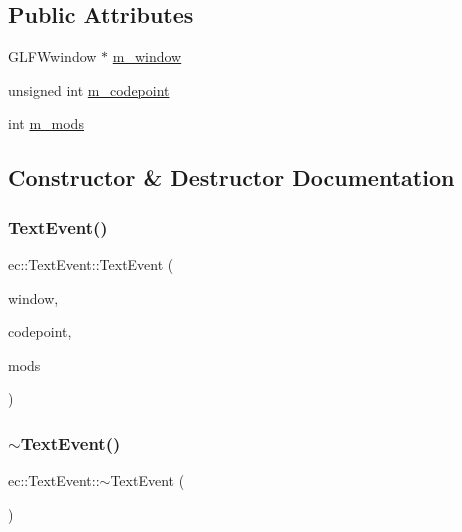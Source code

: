 \subsection*{Public Attributes}
\begin{DoxyCompactItemize}
\item 
G\+L\+F\+Wwindow $\ast$ \mbox{\hyperlink{structec_1_1_text_event_a7ab9619fd97483a705ef8e4ea6bd7f83}{m\+\_\+window}}
\item 
unsigned int \mbox{\hyperlink{structec_1_1_text_event_a2db69911cec1c314623da0682b25ab50}{m\+\_\+codepoint}}
\item 
int \mbox{\hyperlink{structec_1_1_text_event_ac869da2d72b42d8dee86c3261b00fde8}{m\+\_\+mods}}
\end{DoxyCompactItemize}


\subsection{Constructor \& Destructor Documentation}
\mbox{\label{structec_1_1_text_event_a1bb5d951c9c280ed869a5dbfdbdf4f93}} 
\subsubsection{\texorpdfstring{Text\+Event()}{TextEvent()}}
{\footnotesize\ttfamily ec\+::\+Text\+Event\+::\+Text\+Event (\begin{DoxyParamCaption}\item[{G\+L\+F\+Wwindow $\ast$}]{window,  }\item[{const unsigned int}]{codepoint,  }\item[{const int}]{mods }\end{DoxyParamCaption})}

\mbox{\label{structec_1_1_text_event_af6cb457ef115f8fd434aa40c0e4eb71e}} 
\subsubsection{\texorpdfstring{$\sim$\+Text\+Event()}{~TextEvent()}}
{\footnotesize\ttfamily ec\+::\+Text\+Event\+::$\sim$\+Text\+Event (\begin{DoxyParamCaption}{ }\end{DoxyParamCaption})}




